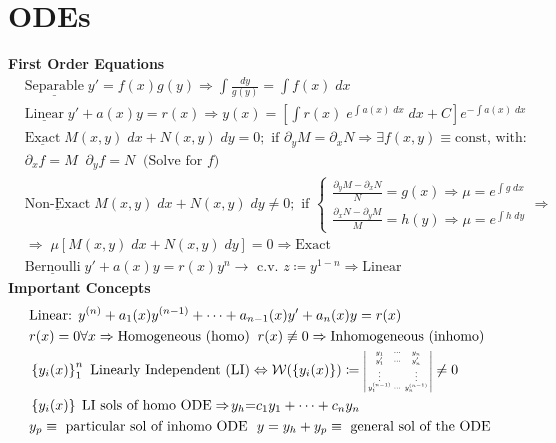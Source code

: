 \section*{ODEs }
\textbf{First Order Equations}
\begin{align*}
&\underline{\text{Separable}}\; 
y'= f(x)g(y)\Rightarrow \int\tfrac{dy}{g(y)}= \int f(x)\! \; dx\\
&\underline{\text{Linear}} \; y'+a(x)y= r(x)\Rightarrow y(x) = \left[ \int r(x)\;\!e^{\int a(x)\;\!dx}\; \!dx + C\right]e^{-\int a(x)\;\! dx}\\
&\underline{\text{Exact}} \;\! M(x,y)\;\! dx+N(x,y)\;\! dy=0; \text{ if } \partial_y M = \partial_x N \Rightarrow \exists f(x,y)\equiv\text{const, with:}\\
&\partial_x f = M \; \; \partial_y f = N \; \; \text{(Solve for $f$)}\\[-2ex]
&\underline{\text{Non-Exact}} \;\! M(x,y)\;\! dx + N(x,y)\;\! dy \neq 0;  \text{ if } 
\left\{
\substack{
\tfrac{\partial_y M -\partial_x N}{N} =g(x) \Rightarrow \mu = e^{\int g\; \! dx}\\
\tfrac{\partial_x N - \partial_y M}{M} =h(y) \Rightarrow \mu = e^{\int h\; \! dy}
}\Rightarrow
\right.\\[-1ex]
&\Rightarrow \;\! \mu [M(x,y)\;\! dx + N(x,y)\;\! dy] = 0 \Rightarrow \text{Exact} \\
&\underline{\text{Bernoulli}} \; \! y' + a(x)y = r(x)y^n \rightarrow \text{ c.v. }z\coloneqq y^{1-n} \Rightarrow \text{Linear}
\end{align*}
\textbf{Important Concepts}
\begin{align*}
&\text{Linear: } y^{(n)} + a_1(x)y^{(n-1)}+\cdots+ a_{n-1}(x)y'+a_{n}(x)y=r(x)\\ 
& r(x) = 0 \forall x \Rightarrow \text{Homogeneous (homo)}\;\;
r(x) \not \equiv 0 \Rightarrow \text{Inhomogeneous (inhomo)}\\
&\left\{y_i (x) \right\}_{1}^n \text{ Linearly Independent (LI)} \Leftrightarrow \mathcal{W}(\left\{y_i (x) \right\}) \coloneqq 
\scalebox{0.7}{$
\left|
\begin{smallmatrix}
y_1 & \cdots & y_n \\
y_1' & \cdots & y_n' \\
\vdots & & \vdots \\
y_1^{(n-1)} & \cdots & y_n^{(n-1)}
\end{smallmatrix}
\right|
$}
\neq 0\\
&\left\{y_i (x) \right\} \; \text{LI sols of homo  ODE} \Rightarrow \!y_h{=}c_1y_1 + {\cdots} + c_n y_n\\
&y_p \equiv \text{ particular sol of inhomo ODE} \ \ y=y_h + y_p \equiv \text{ general sol of the ODE}
\end{align*}

